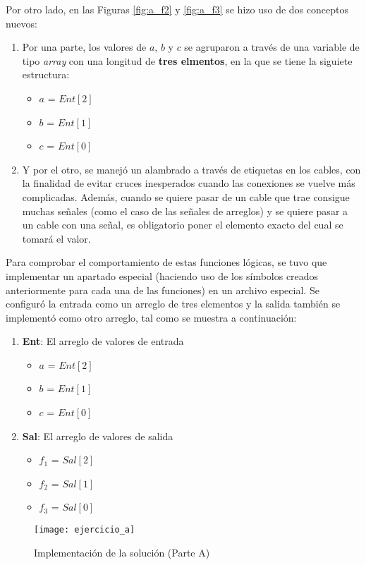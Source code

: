\documentclass[../procedimientos.tex]{subfiles}
\begin{document}
Por otro lado, en las Figuras \ref{fig:a_f2} y \ref{fig:a_f3} se hizo uso de 
dos conceptos nuevos:
\begin{enumerate}
  \item Por una parte, los valores de $a$, $b$ y $c$ se agruparon a través 
    de una variable de tipo \textit{array} con una longitud de \textbf{tres 
    elmentos}, en la que se tiene la siguiete estructura:
    \begin{itemize}
      \item $a$ = $Ent[2]$
      \item $b$ = $Ent[1]$
      \item $c$ = $Ent[0]$
    \end{itemize}
  \item Y por el otro, se manejó un alambrado a través de etiquetas en los 
    cables, con la finalidad de evitar cruces inesperados cuando las 
    conexiones se vuelve más complicadas. Además, cuando se quiere pasar de un 
    cable que trae consigue muchas señales (como el caso de las señales de 
    arreglos) y se quiere pasar a un cable con una señal, es obligatorio poner 
    el elemento exacto del cual se tomará el valor.
\end{enumerate}

Para comprobar el comportamiento de estas funciones lógicas, se tuvo que 
implementar un apartado especial (haciendo uso de los símbolos creados 
anteriormente para cada una de las funciones) en un archivo especial. Se 
configuró la entrada como un arreglo de tres elementos y la salida también se 
implementó como otro arreglo, tal como se muestra a continuación:
\begin{enumerate}
  \item \textbf{Ent}: El arreglo de valores de entrada
    \begin{itemize}
      \item $a$ = $Ent[2]$
      \item $b$ = $Ent[1]$
      \item $c$ = $Ent[0]$
    \end{itemize}
  \item \textbf{Sal}: El arreglo de valores de salida
    \begin{itemize}
      \item $f_1$ = $Sal[2]$
      \item $f_2$ = $Sal[1]$
      \item $f_3$ = $Sal[0]$
    \end{itemize}
\end{enumerate}
\begin{figure}[H]
  \texttt{[image: ejercicio\_a]}
  \caption{Implementación de la solución (Parte A)}
  \label{fig:a_complete}
\end{figure}
\end{document}
